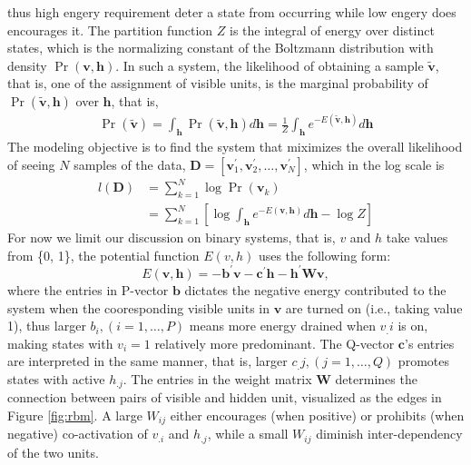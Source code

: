 \documentclass[11pt]{article}
\newcommand{\bs}{\boldsymbol}
\newcommand{\vh}{\boldsymbol{h}}
\newcommand{\vv}{\boldsymbol{v}}
\newcommand{\mD}{\boldsymbol{D}}
\newcommand{\vvt}{\tilde{\vv}}
\begin{document}
thus high engery requirement deter a state from occurring while low engery does encourages it. The partition function $Z$ is the integral of energy over distinct states, which is the normalizing constant of the Boltzmann distribution with density $\Pr(\vv, \vh)$. In such a system, the likelihood of obtaining a sample $\vvt$, that is, one of the assignment of visible units, is the marginal probability of $\Pr(\vvt, \vh)$ over $\vh$, that is,
\begin{equation} \label{eq:probv}
  \begin{split}
    \Pr(\vvt) = \int_{\vh}{\Pr(\vvt, \vh)d\vh} = \frac{1}{Z} \int_{\vh}{e^{-E(\vvt, \vh)}d\vh}
  \end{split}
\end{equation} 
The modeling objective is to find the system that miximizes the overall likelihood of seeing $N$ samples of the data, $\mD=[\vv_1^\prime, \vv_2^\prime, \dots, \vv_N^\prime]$, which in the log scale is
\begin{equation} \label{eq:objective}
  \begin{split}
    l(\mD) &= \sum_{k=1}^N{\log{\Pr(\vv_k)}} \\
    &= \sum_{k=1}^N{[\log{\int_{\vh}{e^{-E(\vv, \vh)}d\vh}} - \log{Z}]}
  \end{split}
\end{equation}
For now we limit our discussion on binary systems, that is, $v$ and $h$ take values from \{0, 1\}, the potential function $E(v, h)$ uses the following form:
\begin{equation} \label{eq:energy}
  E(\vv, \vh) = -\bs{b}^\prime \vv - \bs{c}^\prime \vh - \vh^\prime \bs{W} \vv,
\end{equation}
where the entries in P-vector $\bs{b}$ dictates the negative energy contributed to the system when the cooresponding visible units in $\vv$ are turned on (i.e., taking value 1), thus larger $b_i, (i=1, \dots, P)$ means more energy drained when $v_.i$ is on, making states with $v_i=1$ relatively more predominant. The Q-vector $\bs{c}$'s entries are interpreted in the same manner, that is, larger $c_.j, (j=1, \dots, Q)$ promotes states with active $h_{.j}$. The entries in the weight matrix $\bs{W}$ determines the connection between pairs of visible and hidden unit, visualized as the edges in Figure \ref{fig:rbm}. A large $W_{ij}$ either encourages (when positive) or prohibits (when negative) co-activation of $v_{.i}$ and $h_{.j}$, while a small $W_{ij}$ diminish inter-dependency of the two units. 
\end{document}
